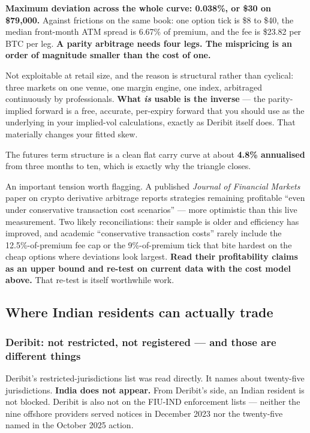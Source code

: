 \documentclass[11pt,a4paper]{article}
\newcommand{\srcnote}[1]{{\footnotesize\color{soft}#1\par}}
\begin{document}
\textbf{Maximum deviation across the whole curve: 0.038\%, or \$30 on \$79{,}000.}
Against frictions on the same book: one option tick is \$8 to \$40, the median
front-month ATM spread is 6.67\% of premium, and the fee is \$23.82 per BTC per
leg. \textbf{A parity arbitrage needs four legs. The mispricing is an order of
magnitude smaller than the cost of one.}

Not exploitable at retail size, and the reason is structural rather than cyclical:
three markets on one venue, one margin engine, one index, arbitraged continuously
by professionals. \textbf{What \emph{is} usable is the inverse} --- the
parity-implied forward is a free, accurate, per-expiry forward that you should use
as the underlying in your implied-vol calculations, exactly as Deribit itself
does. That materially changes your fitted skew.

The futures term structure is a clean flat carry curve at about \textbf{4.8\%
annualised} from three months to ten, which is exactly why the triangle closes.

\srcnote{An important tension worth flagging. A published \emph{Journal of
Financial Markets} paper on crypto derivative arbitrage reports strategies
remaining profitable ``even under conservative transaction cost scenarios'' ---
more optimistic than this live measurement. Two likely reconciliations: their
sample is older and efficiency has improved, and academic ``conservative
transaction costs'' rarely include the 12.5\%-of-premium fee cap or the
9\%-of-premium tick that bite hardest on the cheap options where deviations look
largest. \textbf{Read their profitability claims as an upper bound and re-test on
current data with the cost model above.} That re-test is itself worthwhile work.}

\subsection{Where Indian residents can actually trade}

\subsubsection{Deribit: not restricted, not registered --- and those are different things}

Deribit's restricted-jurisdictions list was read directly. It names about
twenty-five jurisdictions. \textbf{India does not appear.} From Deribit's side, an
Indian resident is not blocked. Deribit is also not on the FIU-IND enforcement
lists --- neither the nine offshore providers served notices in December 2023 nor
the twenty-five named in the October 2025 action.
\end{document}
